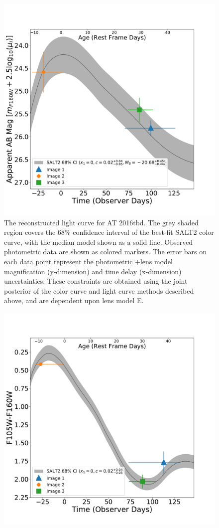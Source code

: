 \documentclass[12pt]{article}
\def\SNABC{AT 2016tbd\xspace}
\begin{document}
{\begin{figure}[htp]
    \centering
    \includegraphics[width=\textwidth]{Paper/Figures/full_lightcurve.pdf}
    \caption{\label{fig:full_lightcurve}The reconstructed light curve for \SNABC. The grey shaded region covers the 68\% confidence interval of the best-fit SALT2 color curve, with the median model shown as a solid line. Observed photometric data are shown as colored markers.   The error bars on each data point represent the photometric +lens model magnification (y-dimension) and time delay (x-dimension) uncertainties. These constraints are obtained using the joint posterior of the color curve and light curve methods described above, and are dependent upon lens model E.}
\end{figure}
\begin{figure}[hbp]
    \centering
    \includegraphics[width=\textwidth]{Paper/Figures/full_colorcurve_total.pdf}

\end{figure}}
\end{document}
